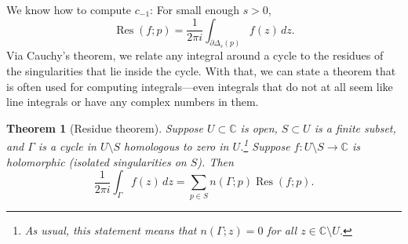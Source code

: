 \documentclass[12pt,openany]{book}
\newcommand{\C}{{\mathbb{C}}}
\theoremstyle{plain}
\newtheorem{thm}{Theorem}[section]
\theoremstyle{remark}
\theoremstyle{definition}
\theoremstyle{exercise}
\theoremstyle{example}
\begin{document}
We know how to compute $c_{-1}$: For small enough $s > 0$,
\begin{equation*}
\operatorname{Res}(f;p) 
=
\frac{1}{2\pi i} \int_{\partial \Delta_{s}(p)} f(z) \, dz .
\end{equation*}
Via Cauchy's theorem, we relate any integral around
a cycle to the residues of the singularities that lie inside the cycle.
With that, we can state a theorem that is often used for computing
integrals---even integrals that do not at all seem like line integrals or
have any complex numbers in them.

\begin{thm}[Residue theorem]\label{thm:residue}
\pagebreak[2]
Suppose $U \subset \C$ is open, $S \subset U$ is a finite subset,
and $\Gamma$ is
a cycle
in $U \setminus S$
homologous to zero in $U$.\footnote{As usual, this statement means that
$n(\Gamma;z) = 0$ for all $z \in \C \setminus U$.}
Suppose $f \colon U \setminus S \to \C$ is holomorphic (isolated
singularities on $S$).
Then
\begin{equation*}
\frac{1}{2\pi i} \int_{\Gamma} f(z) \, dz = \sum_{p \in S} n(\Gamma;p) \operatorname{Res}(f;p) .
\end{equation*}
\end{thm}
\end{document}
